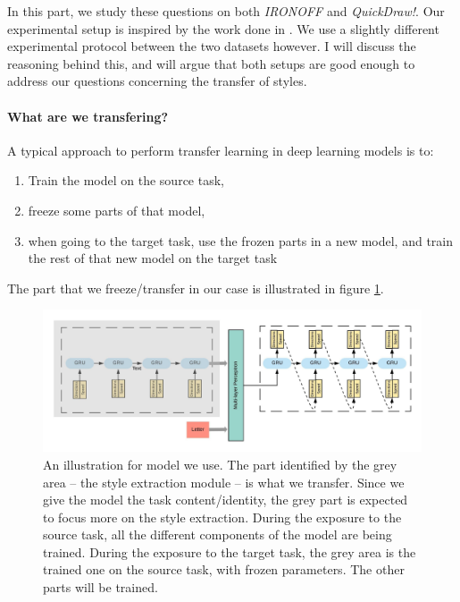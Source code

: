   \par In this part, we study these questions on both \textit{IRONOFF} and \textit{QuickDraw!}. Our experimental setup is inspired by the work done in \citep{8686063}. We use a slightly different experimental protocol between the two datasets however. I will discuss the reasoning behind this, and will argue that both setups are good enough to address our questions concerning the transfer of styles.

  \paragraph{What are we transfering?} A typical approach to perform transfer learning in deep learning models is to:
    \begin{enumerate}
      \item Train the model on the source task,
      \item freeze some parts of that model,
      \item when going to the target task, use the frozen parts in a new model, and train the rest of that new model on the target task
    \end{enumerate}

    The part that we freeze/transfer in our case is illustrated in figure \ref{fig:transfer_part_illustration}.
  \begin{figure}
    \includegraphics[scale=0.95]{./images/sota/transfer_part.jpeg}
    \caption{An illustration for model we use. The part identified by the grey area -- the style extraction module -- is what we transfer. Since we give the model the task content/identity, the grey part is expected to focus more on the style extraction. During the exposure to the source task, all the different components of the model are being trained. During the exposure to the target task, the grey area is the trained one on the source task, with frozen parameters. The other parts will be trained.}
    \label{fig:transfer_part_illustration}
  \end{figure}

